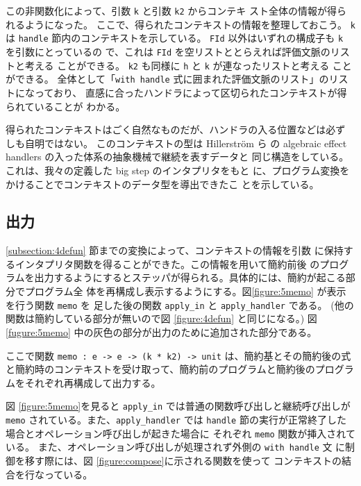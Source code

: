 この非関数化によって、引数 \texttt{k} と引数 \texttt{k2} からコンテキ
スト全体の情報が得られるようになった。
ここで、得られたコンテキストの情報を整理しておこう。
\texttt{k} は \texttt{handle} 節内のコンテキストを示している。
\texttt{FId} 以外はいずれの構成子も \texttt{k} を引数にとっているの
で、これは \texttt{FId} を空リストととらえれば評価文脈のリストと考える
ことができる。
\texttt{k2} も同様に \texttt{h} と \texttt{k} が連なったリストと考える
ことができる。
全体として「\texttt{with handle} 式に囲まれた評価文脈のリスト」のリストになっており、
直感に合ったハンドラによって区切られたコンテキストが得られていることが
わかる。

得られたコンテキストはごく自然なものだが、ハンドラの入る位置などは必ず
しも自明ではない。
このコンテキストの型は
Hillerstr\"{o}m ら \cite{10.1145/2976022.2976033, e6cb0c3222794e48bf38cf44e46fe4aa} の
algebraic effect handlers の入った体系の抽象機械で継続を表すデータと
同じ構造をしている。
これは、我々の定義した big step のインタプリタをもと
に、プログラム変換をかけることでコンテキストのデータ型を導出できたこ
とを示している。

\subsection{出力}
\label{subsection:memo}

\ref{subsection:4defun} 節までの変換によって、コンテキストの情報を引数
に保持するインタプリタ関数を得ることができた。この情報を用いて簡約前後
のプログラムを出力するようにするとステッパが得られる。具体的には、簡約が起こる部分でプログラム全
体を再構成し表示するようにする。図\ref{figure:5memo}
が表示を行う関数 \texttt{memo} を
足した後の関数 \texttt{apply\_in} と \texttt{apply\_handler}
である。
(他の関数は簡約している部分が無いので図 \ref{figure:4defun} と同じになる。)
図 \ref{fugure:5memo} 中の灰色の部分が出力のために追加された部分である。

ここで関数 \texttt{memo :\ e -> e -> (k * k2) -> unit} は、簡約基とその簡約後の式と簡約時のコンテキストを受け取って、簡約前のプログラムと簡約後のプログラムをそれぞれ再構成して出力する。

図 \ref{figure:5memo}を見ると \texttt{apply\_in} では普通の関数呼び出しと継続呼び出しが
\texttt{memo} されている。また、\texttt{apply\_handler} では
\texttt{handle} 節の実行が正常終了した場合とオペレーション呼び出しが起きた場合に
それぞれ \texttt{memo} 関数が挿入されている。
また、オペレーション呼び出しが処理されず外側の \texttt{with handle} 文
に制御を移す際には、図 \ref{figure:compose}に示される関数を使って
コンテキストの結合を行なっている。


